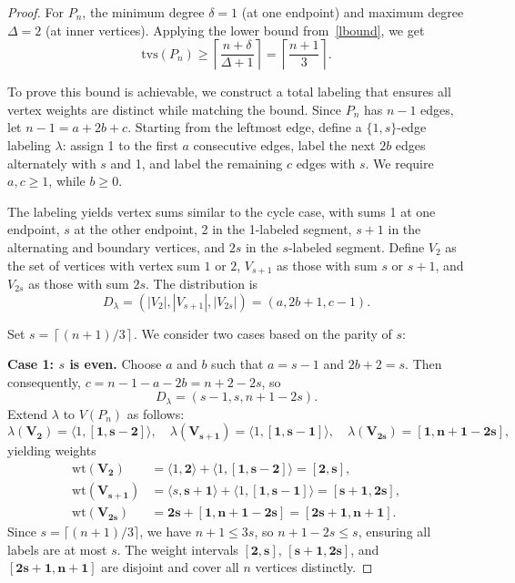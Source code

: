 \documentclass[11pt]{article}
\numberwithin{equation}{section}
\newcommand{\wt}{\mathrm{wt}}
\newcommand{\bv}[1]{\mathbf{#1}}
\begin{document}
\begin{proof}
For \(P_n\), the minimum degree \(\delta = 1\) (at one endpoint) and maximum degree \(\Delta = 2\) (at inner vertices). Applying the lower bound from~\eqref{lbound}, we get
\[
\mathrm{tvs}(P_n) \geq \left\lceil \frac{n + \delta}{\Delta + 1} \right\rceil = \left\lceil \frac{n + 1}{3} \right\rceil.
\]

To prove this bound is achievable, we construct a total labeling that ensures all vertex weights are distinct while matching the bound. Since \(P_n\) has \(n - 1\) edges, let \(n - 1 = a + 2b + c\). Starting from the leftmost edge, define a \(\{1,s\}\)-edge labeling \(\lambda\): assign 1 to the first \(a\) consecutive edges, label the next \(2b\) edges alternately with \(s\) and 1, and label the remaining \(c\) edges with \(s\). We require \(a, c \geq 1\), while \(b \geq 0\).

The labeling yields vertex sums similar to the cycle case, with sums 1 at one endpoint, \(s\) at the other endpoint, 2 in the 1-labeled segment, \(s + 1\) in the alternating and boundary vertices, and \(2s\) in the \(s\)-labeled segment. Define \(V_2\) as the set of vertices with vertex sum \(1\) or \(2\), \(V_{s+1}\) as those with sum \(s\) or \(s + 1\), and \(V_{2s}\) as those with sum \(2s\). The distribution is
\[
D_{\lambda} = (|V_2|, |V_{s+1}|, |V_{2s}|) = (a, 2b + 1, c - 1).
\]

Set \(s = \left\lceil (n + 1) / 3 \right\rceil\). We consider two cases based on the parity of \(s\):

\textbf{Case 1: \(s\) is even.} Choose \(a\) and \(b\) such that \(a = s - 1\) and \(2b + 2 = s\). Then consequently, \(c = n - 1 - a - 2b = n + 2 - 2s\), so
\[
D_{\lambda} = (s - 1, s, n + 1 - 2s).
\]
Extend \(\lambda\) to \(V(P_n)\) as follows:
\[
\lambda(\bv{V_2}) = \langle 1, \bv{[1,s-2]} \rangle, \quad \lambda(\bv{V_{s+1}}) = \langle 1, \bv{[1,s-1]} \rangle, \quad \lambda(\bv{V_{2s}}) = \bv{[1, n+1-2s]},
\]
yielding weights
\begin{align*}
\wt(\bv{V_2}) &= \langle 1, \bv{2} \rangle + \langle 1, \bv{[1,s-2]} \rangle = \bv{[2,s]}, \\
\wt(\bv{V_{s+1}}) &= \langle s, \bv{s+1} \rangle + \langle 1, \bv{[1,s-1]} \rangle = \bv{[s+1,2s]}, \\
\wt(\bv{V_{2s}}) &= \bv{2s} + \bv{[1,n+1-2s]} = \bv{[2s+1,n+1]}.
\end{align*}
Since \(s = \lceil (n + 1) / 3 \rceil\), we have \(n + 1 \leq 3s\), so \(n + 1 - 2s \leq s\), ensuring all labels are at most \(s\). The weight intervals \(\bv{[2,s]}\), \(\bv{[s+1,2s]}\), and \(\bv{[2s+1,n+1]}\) are disjoint and cover all \(n\) vertices distinctly.


\end{proof}
\end{document}

